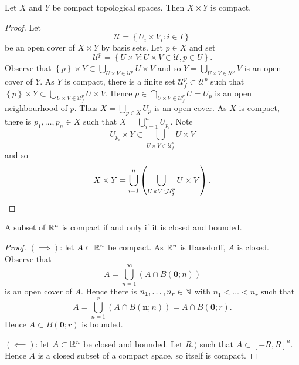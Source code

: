 
\begin{theorem}[]
	Let $X$ and $Y$ be compact topological spaces.
	Then $X \times Y$ is compact.
\end{theorem}

\begin{proof}
	Let
	\[
		\mathcal U = \left\{
			U_i \times V_i: i \in I
		\right\}
	\]
	be an open cover of $X \times Y$ by basis sets.
	Let $p \in X$ and set
	\[
		\mathcal U^p = \left\{
			U \times V: U \times V \in \mathcal U, p \in U
		\right\}.
	\]
	Observe that
	$
		\left\{
			p
		\right\}
		\times Y
		\subset
		\bigcup_{U \times V \in \mathcal U^p} U \times V
	$
	and so
	$
		Y =
		\bigcup_{U \times V \in \mathcal U^p} V
	$
	is an open cover of $Y$.
	As $Y$ is compact, there is a finite set
	$\mathcal U_f^p \subset \mathcal U^p$
	such that
	$
		\left\{
			p
		\right\}
		\times Y 
		\subset
		\bigcup_{U \times V \in \mathcal U_f^p} U \times V.
	$
	Hence
	$
		p \in \bigcap_{U \times V \in \mathcal U_f^p} U = U_p
	$
	is an open neighbourhood of $p$.
	Thus $X = \bigcup_{p \in X} U_p$
	is an open cover.
	As $X$ is compact, there is $p_1, \ldots, p_n \in X$
	such that $X = \bigcup_{i=1}^n U_{p_i}$.
	Note
	\[
		U_{p_i} \times Y \subset
		\bigcup_{U \times V \in \mathcal U_f^p} U \times V
	\]
	and so
	\[
		X \times Y =
		\bigcup_{i=1}^n \left( 
			\bigcup_{U \times V \in \mathcal U_f^p} U \times V 
		\right). \qedhere
	\]
\end{proof}

\begin{theorem}
	A subset of $\mathbb{R}^n$ is compact if and only if it is closed and bounded.
\end{theorem}

\begin{proof}
	$(\implies)$: let $A \subset \mathbb{R}^n$ be compact.
	As $\mathbb{R}^n$ is Hausdorff, $A$ is closed.
	Observe that
	\[
		A = \bigcup_{n=1}^\infty \left( 
			A \cap B(\bm 0; n) 
		\right)
	\]
	is an open cover of $A$.
	Hence there is $n_1, \ldots, n_r \in \mathbb{N}$ with $n_1 < \ldots < n_r$
	such that
	\[
		A =
		\bigcup_{n=1}^r \left( 
			A \cap B(\bm n; n) 
		\right)
		= A \cap B(\bm 0; r).
	\]
	Hence $A \subset B(\bm 0; r)$ is bounded.

	$(\impliedby)$: let $A \subset \mathbb{R}^n$ be closed and bounded.
	Let $R . )$ such that $A \subset [-R, R]^n$.
	Hence $A$ is a closed subset of a compact space, so itself is compact.
\end{proof}

